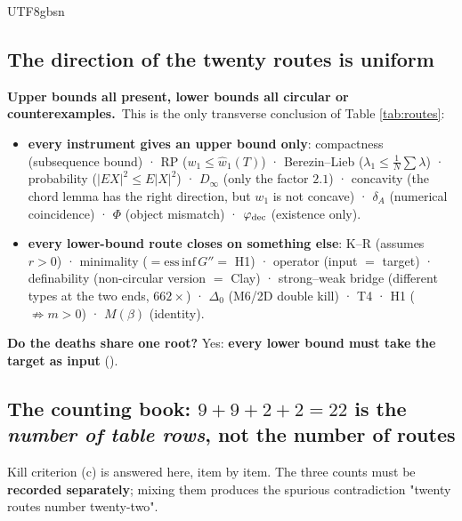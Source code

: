 \documentclass[11pt,a4paper]{article}
\newcommand{\code}[1]{\texttt{\footnotesize\detokenize{#1}}\allowbreak}
\begin{document}
\begin{CJK}{UTF8}{gbsn}
\subsection{The direction of the twenty routes is \textbf{uniform}}

\begin{keybox}
\textbf{Upper bounds all present, lower bounds all circular or counterexamples.}\ This is the only transverse conclusion of Table \ref{tab:routes}:
\begin{itemize}
\item \textbf{every instrument gives an upper bound only}: compactness (subsequence bound) · RP ($w_1\le\hat w_1(T)$) · Berezin--Lieb ($\lambda_1\le\frac1N\sum\lambda$) ·
probability ($|EX|^2\le E|X|^2$) · $D_\infty$ (only the factor $2.1$) · concavity (the chord lemma has the right direction, but $w_1$ is not concave) · $\delta_A$ (numerical coincidence) · $\Phi$ (object mismatch) · $\varphi_{\rm dec}$ (existence only).
\item \textbf{every lower-bound route closes on something else}: K--R (assumes $r>0$) · minimality ($=\mathrm{ess\,inf}\,G''=$ H1) · operator (input $=$ target) ·
definability (non-circular version $=$ Clay) · strong--weak bridge (different types at the two ends, $662\times$) · $\Delta_0$ (M6/2D double kill) · T4 · H1 ($\not\Rightarrow m>0$) · $M(\beta)$ (identity).
\end{itemize}
\textbf{Do the deaths share one root?} Yes: \textbf{every lower bound must take the target as input} (\code{RUNBOOK:19513--19518}).
\end{keybox}

\subsection{The counting book: $9+9+2+2=22$ is the \emph{number of table rows}, not the number of routes}\label{sec:count}

Kill criterion (c) is answered here, item by item. The three counts must be \textbf{recorded separately}; mixing them produces the spurious contradiction "twenty routes number twenty-two".


\end{CJK}
\end{document}
